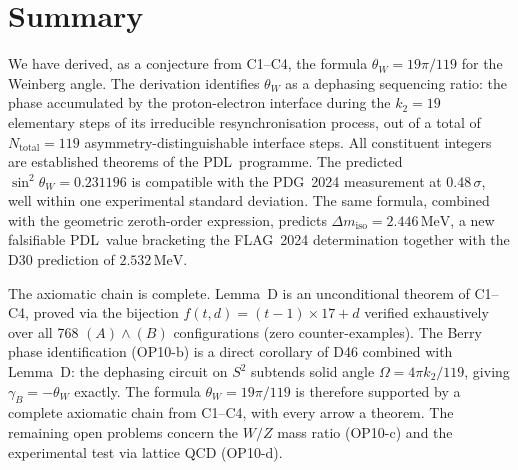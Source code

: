 \documentclass[12pt,a4paper]{article}
\theoremstyle{plain}
\theoremstyle{definition}
\theoremstyle{remark}
\newcommand{\PDL}{\textsc{PDL}}
\newcommand{\thetaW}{\theta_W}
\newcommand{\sinW}{\sin^2\!\thetaW}
\newcommand{\Ntot}{N_{\mathrm{total}}}
\newcommand{\Dmiso}{\Delta m_{\mathrm{iso}}}
\newcommand{\ktwo}{k_2}
\begin{document}
\section{Summary}
\label{sec:summary}

We have derived, as a conjecture from C1--C4, the formula $\thetaW = 19\pi/119$ for the Weinberg angle. The derivation identifies $\thetaW$ as a dephasing sequencing ratio: the phase accumulated by the proton-electron interface during the $\ktwo = 19$ elementary steps of its irreducible resynchronisation process, out of a total of $\Ntot = 119$ asymmetry-distinguishable interface steps. All constituent integers are established theorems of the \PDL\ programme. The predicted $\sinW = 0.231196$ is compatible with the PDG~2024 measurement at $0.48\,\sigma$, well within one experimental standard deviation. The same formula, combined with the geometric zeroth-order expression, predicts $\Dmiso = 2.446\,\mathrm{MeV}$, a new falsifiable \PDL\ value bracketing the FLAG~2024 determination together with the D30 prediction of $2.532\,\mathrm{MeV}$.

The axiomatic chain is complete. Lemma~D is an unconditional theorem of C1--C4, proved via the bijection $f(t,d) = (t-1)\times 17 + d$ verified exhaustively over all 768 $(A)\wedge(B)$ configurations (zero counter-examples). The Berry phase identification (OP10-b) is a direct corollary of D46 combined with Lemma~D: the dephasing circuit on $S^2$ subtends solid angle $\Omega = 4\pi k_2/119$, giving $\gamma_B = -\theta_W$ exactly. The formula $\thetaW = 19\pi/119$ is therefore supported by a complete axiomatic chain from C1--C4, with every arrow a theorem. The remaining open problems concern the $W/Z$ mass ratio (OP10-c) and the experimental test via lattice QCD (OP10-d).

\clearpage


\end{document}
